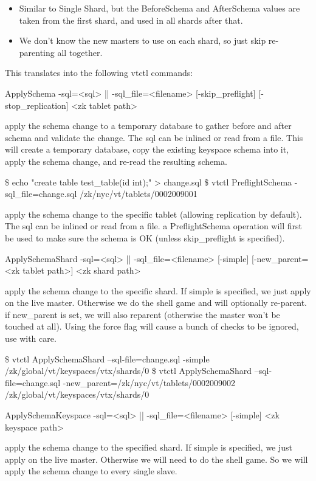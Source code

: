\begin{itemize}
\item Similar to Single Shard, but the BeforeSchema and AfterSchema values are taken from the first shard, and used in all shards after that.
\item We don't know the new masters to use on each shard, so just skip re-parenting all together.
\end{itemize}

This translates into the following vtctl commands:

\begin{codesample2}
  ApplySchema {-sql=<sql> || -sql_file=<filename>} 
              [-skip_preflight] [-stop_replication] <zk tablet path> 
\end{codesample2}

apply the schema change to a temporary database to gather before and after schema and validate the change. The sql can be inlined or read from a file.
This will create a temporary database, copy the existing keyspace schema into it, apply the schema change, and re-read the resulting schema.


\begin{codesample2}
\$ echo "create table test\_table(id int);" \textgreater{} change.sql
\$ vtctl PreflightSchema -sql\_file=change.sql /zk/nyc/vt/tablets/0002009001
\end{codesample2}

apply the schema change to the specific tablet (allowing replication by default). The sql can be inlined or read from a file.
a PreflightSchema operation will first be used to make sure the schema is OK (unless skip\_preflight is specified).

\begin{codesample2}
  ApplySchemaShard {-sql=<sql> || 
  -sql_file=<filename>} [-simple] [-new_parent=<zk tablet path>] <zk shard path>
\end{codesample2}

apply the schema change to the specific shard. If simple is specified, we just apply on the live master. Otherwise we do the shell game and will optionally re-parent. 
if new\_parent is set, we will also reparent (otherwise the master won't be touched at all). Using the force flag will cause a bunch of checks to be ignored, use with care.

\begin{codesample2}
\$ vtctl ApplySchemaShard --sql-file=change.sql 
                     -simple /zk/global/vt/keyspaces/vtx/shards/0
\$ vtctl ApplySchemaShard --sql-file=change.sql 
      -new\_parent=/zk/nyc/vt/tablets/0002009002 /zk/global/vt/keyspaces/vtx/shards/0
\end{codesample2}

\begin{codesample2}
  ApplySchemaKeyspace {-sql=<sql> || -sql_file=<filename>} [-simple] <zk keyspace path> 
\end{codesample2}

apply the schema change to the specified shard. If simple is specified, we just apply on the live master. Otherwise we will need to do the shell game. So we will apply the schema change to every single slave. 

